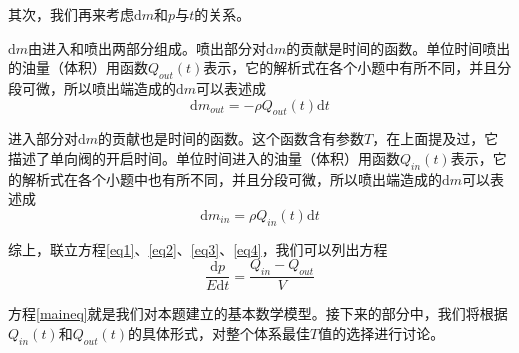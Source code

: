 \documentclass[12pt,AutoFakeBold]{article}%
\newcommand{\dif}{\mathrm{d}}
\begin{document}
    \par
    其次，我们再来考虑$\dif m$和$p$与$t$的关系。\par
    $\dif m$由进入和喷出两部分组成。喷出部分对$\dif m$的贡献是时间的函数。单位时间喷出的油量（体积）用函数$Q_{out}(t)$表示，它的解析式在各个小题中有所不同，并且分段可微，所以喷出端造成的$\dif m$可以表述成
    \begin{equation}
        \dif m_{out}=-\rho Q_{out}(t)\dif t
        \label{eq3}
    \end{equation}\par
    进入部分对$\dif m$的贡献也是时间的函数。这个函数含有参数$T$，在上面提及过，它描述了单向阀的开启时间。单位时间进入的油量（体积）用函数$Q_{in}(t)$表示，它的解析式在各个小题中也有所不同，并且分段可微，所以喷出端造成的$\dif m$可以表述成
    \begin{equation}
        \dif m_{in}=\rho Q_{in}(t)\dif t
        \label{eq4}
    \end{equation}\par
    综上，联立方程\ref{eq1}、\ref{eq2}、\ref{eq3}、\ref{eq4}，我们可以列出方程
    \begin{equation}
        \frac{\dif p}{E\dif t}=\frac{Q_{in}-Q_{out}}{V}
        \label{maineq}
    \end{equation}\par
    方程\ref{maineq}就是我们对本题建立的基本数学模型。接下来的部分中，我们将根据$Q_{in}(t)$和$Q_{out}(t)$的具体形式，对整个体系最佳$T$值的选择进行讨论。
    
\end{document}
